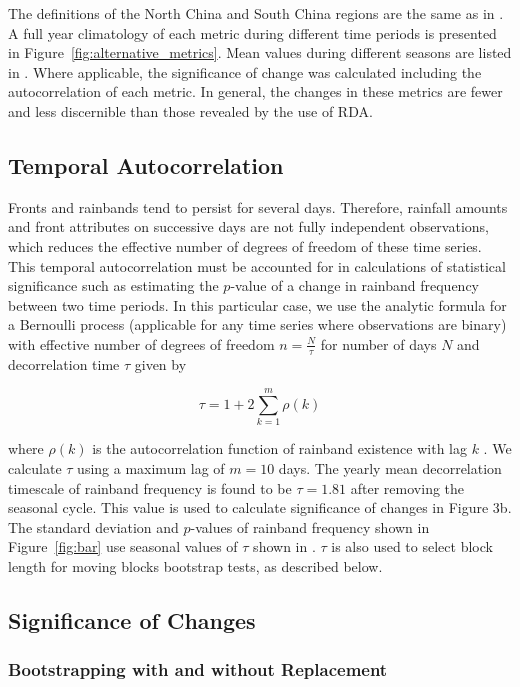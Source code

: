 \documentclass[singlecolumn,11pt]{pnas-new}
\begin{document}
 The definitions of the North China and South China regions are the same as in \citet{Yu2010}. A full year climatology of each metric during different time periods is presented in Figure~\ref{fig:alternative_metrics}. Mean values during different seasons are listed in \citet{Day2016}. Where applicable, the significance of change was calculated including the autocorrelation of each metric. In general, the changes in these metrics are fewer and less discernible than those revealed by the use of RDA.
 
 \subsection{Temporal Autocorrelation}

	Fronts and rainbands tend to persist for several days. Therefore, rainfall amounts and front attributes on successive days are not fully independent observations, which reduces the effective number of degrees of freedom of these time series. This temporal autocorrelation must be accounted for in calculations of statistical significance such as estimating the $p$-value of a change in rainband frequency between two time periods. In this particular case, we use the analytic formula for a Bernoulli process (applicable for any time series where observations are binary) with effective number of degrees of freedom $n=\frac{N}{\tau}$ for number of days $N$ and decorrelation time $\tau$ given by

\begin{equation*}
\tau=1+2\sum_{k=1}^m \rho(k)
\end{equation*}

	where $\rho(k)$ is the autocorrelation function of rainband existence with lag $k$ \citep{VonStorch1999}. We calculate $\tau$ using a maximum lag of $m=10$ days. The yearly mean decorrelation timescale of rainband frequency is found to be $\tau = 1.81$ after removing the seasonal cycle. This value is used to calculate significance of changes in Figure 3b. The standard deviation and $p$-values of rainband frequency shown in Figure~\ref{fig:bar} use seasonal values of $\tau$ shown in \citet{Day2016}. $\tau$ is also used to select block length for moving blocks bootstrap tests, as described below.
 
\subsection{Significance of Changes}

\subsubsection{Bootstrapping with and without Replacement}
\end{document}
